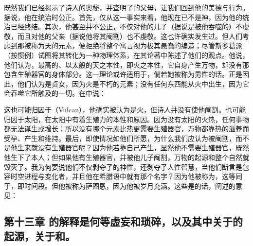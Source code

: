 既然我们已经揭示了诗人的奥秘，并查明了的父母，让我们回到他的美德与行为。据说，他在统治时公正。首先，仅从这一事实来看，他现在已不是神，因为他的统治已经终结。其次，他甚至并不公正，不仅对他的儿子（据说是被他吞噬的）不虔敬，而且对他的父亲（据说他将其阉割）也不虔敬。这也许确实发生过。但人们考虑到那被称为天的元素，便拒绝将整个寓言视为极其愚蠢的编造；尽管斯多葛派（按惯例）试图将其转化为一种物理体系，在其论著中陈述了他们的观点。他说，他们认为，最高的、以太般的天之本性，即火之本性，它自身产生万物，却没有那包含生殖器官的身体部分。这一理论或许适用于，倘若她被称为男性的话。正是因此，他们认为是贞女，因为火是不朽的元素；没有任何东西能从火中出生，因为它会吞噬它所触及的一切。在中说：\par

这也可能归因于（Vulcan），他确实被认为是火，但诗人并没有使他阉割。也可能归因于太阳，在太阳中有着生殖力的本性和原因。因为没有太阳的火热，任何事物都无法诞生或增长；所以没有哪个元素比热更需要生殖器官，万物都靠热的滋养而受孕、产生和维持。最后，即使情况如他们所愿，为什么我们应认为被阉割，而不是他生来就没有生殖器官呢？因为他若靠自己产生，显然他不需要生殖器官，既然他生下了本人；但如果他有生殖器官，并被他儿子阉割，万物的起源和整个自然就毁灭了。我为何要说他们不仅剥夺了的神性，还剥夺了人性智慧，当他们断言是包容时空进程与变化者，并且他在希腊语中就有那个名字？因为他被称为，这等同于，即时间段。但他被称为萨图恩，因为他被岁月充满。这些是的话，阐述的意见：\par


\subsection{第十三章 的解释是何等虚妄和琐碎，以及其中关于的起源，关于和。}

